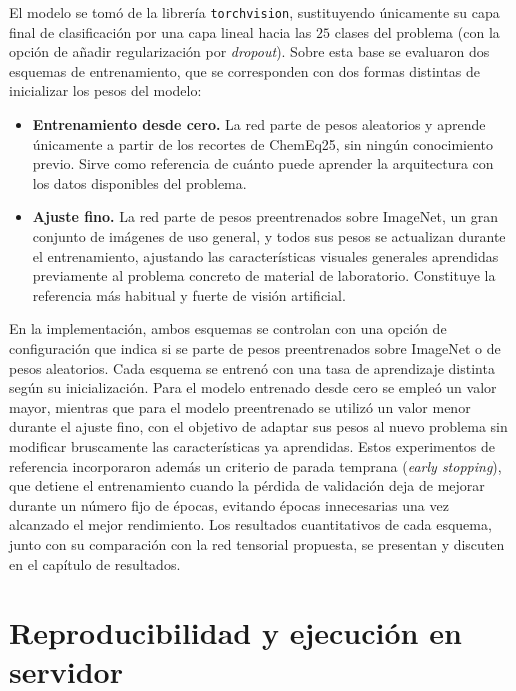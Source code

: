 El modelo se tomó de la librería \texttt{torchvision}, sustituyendo únicamente su capa final de clasificación por una capa lineal hacia las $25$ clases del problema (con la opción de añadir regularización por \textit{dropout}). Sobre esta base se evaluaron dos esquemas de entrenamiento, que se corresponden con dos formas distintas de inicializar los pesos del modelo:

\begin{itemize}
    \item \textbf{Entrenamiento desde cero.} La red parte de pesos aleatorios y aprende únicamente a partir de los recortes de ChemEq25, sin ningún conocimiento previo. Sirve como referencia de cuánto puede aprender la arquitectura con los datos disponibles del problema.

    \item \textbf{Ajuste fino.} La red parte de pesos preentrenados sobre ImageNet, un gran conjunto de imágenes de uso general, y todos sus pesos se actualizan durante el entrenamiento, ajustando las características visuales generales aprendidas previamente al problema concreto de material de laboratorio. Constituye la referencia más habitual y fuerte de visión artificial.
\end{itemize}

En la implementación, ambos esquemas se controlan con una opción de configuración que indica si se parte de pesos preentrenados sobre ImageNet o de pesos aleatorios. Cada esquema se entrenó con una tasa de aprendizaje distinta según su inicialización. Para el modelo entrenado desde cero se empleó un valor mayor, mientras que para el modelo preentrenado se utilizó un valor menor durante el ajuste fino, con el objetivo de adaptar sus pesos al nuevo problema sin modificar bruscamente las características ya aprendidas. Estos experimentos de referencia incorporaron además un criterio de parada temprana (\textit{early stopping}), que detiene el entrenamiento cuando la pérdida de validación deja de mejorar durante un número fijo de épocas, evitando épocas innecesarias una vez alcanzado el mejor rendimiento. Los resultados cuantitativos de cada esquema, junto con su comparación con la red tensorial propuesta, se presentan y discuten en el capítulo de resultados.

\section{Reproducibilidad y ejecución en servidor}\label{sec:reproducibilidad}

